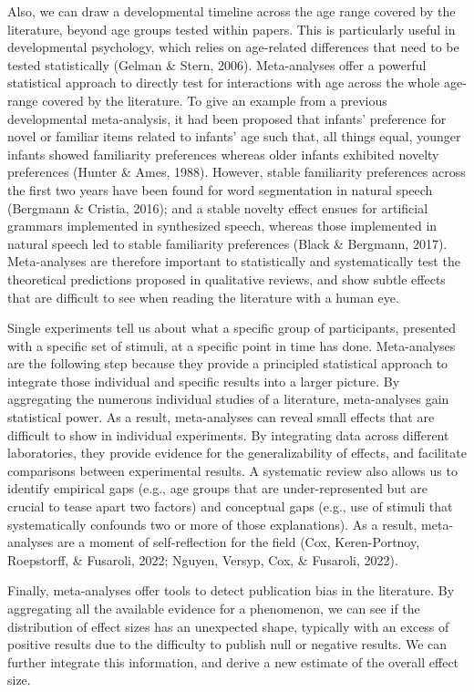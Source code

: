 \documentclass[
  man,mask,floatsintext]{apa6}
\begin{document}
Also, we can draw a developmental timeline across the age range covered by the literature, beyond age groups tested within papers. This is particularly useful in developmental psychology, which relies on age-related differences that need to be tested statistically (Gelman \& Stern, 2006). Meta-analyses offer a powerful statistical approach to directly test for interactions with age across the whole age-range covered by the literature. To give an example from a previous developmental meta-analysis, it had been proposed that infants' preference for novel or familiar items related to infants' age such that, all things equal, younger infants showed familiarity preferences whereas older infants exhibited novelty preferences (Hunter \& Ames, 1988). However, stable familiarity preferences across the first two years have been found for word segmentation in natural speech (Bergmann \& Cristia, 2016); and a stable novelty effect ensues for artificial grammars implemented in synthesized speech, whereas those implemented in natural speech led to stable familiarity preferences (Black \& Bergmann, 2017). Meta-analyses are therefore important to statistically and systematically test the theoretical predictions proposed in qualitative reviews, and show subtle effects that are difficult to see when reading the literature with a human eye.

Single experiments tell us about what a specific group of participants, presented with a specific set of stimuli, at a specific point in time has done. Meta-analyses are the following step because they provide a principled statistical approach to integrate those individual and specific results into a larger picture. By aggregating the numerous individual studies of a literature, meta-analyses gain statistical power. As a result, meta-analyses can reveal small effects that are difficult to show in individual experiments. By integrating data across different laboratories, they provide evidence for the generalizability of effects, and facilitate comparisons between experimental results. A systematic review also allows us to identify empirical gaps (e.g., age groups that are under-represented but are crucial to tease apart two factors) and conceptual gaps (e.g., use of stimuli that systematically confounds two or more of those explanations). As a result, meta-analyses are a moment of self-reflection for the field (Cox, Keren-Portnoy, Roepstorff, \& Fusaroli, 2022; Nguyen, Versyp, Cox, \& Fusaroli, 2022).

Finally, meta-analyses offer tools to detect publication bias in the literature. By aggregating all the available evidence for a phenomenon, we can see if the distribution of effect sizes has an unexpected shape, typically with an excess of positive results due to the difficulty to publish null or negative results. We can further integrate this information, and derive a new estimate of the overall effect size.
\end{document}
